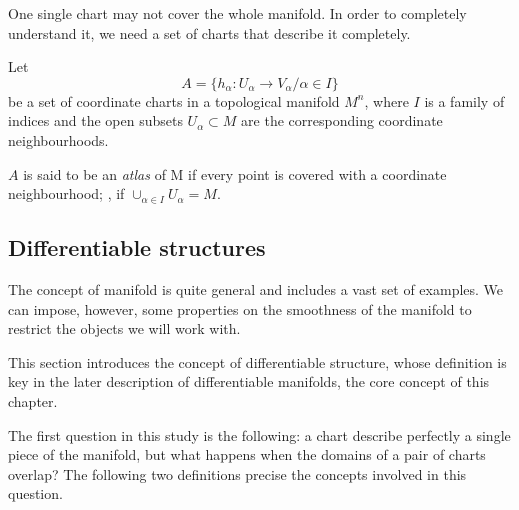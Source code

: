 One single chart may not cover the whole manifold. In order to completely understand it, we need a set of charts that describe it completely.

\begin{definition}
    Let
    \[
    A = \{h_\alpha \colon U_\alpha \to V_\alpha / \alpha \in I\}
    \]
    be a set of coordinate charts in a topological manifold $M^n$, where $I$ is a family of indices and the open subsets $U_\alpha \subset M$ are the corresponding coordinate neighbourhoods.

    $A$ is said to be an \emph{atlas} of M if every point is covered with a coordinate neighbourhood; \ie, if $\cup_{\alpha \in I} U_\alpha = M$.
\end{definition}


\subsection{Differentiable structures}

The concept of manifold is quite general and includes a vast set of examples. We can impose, however, some properties on the smoothness of the manifold to restrict the objects we will work with.

This section introduces the concept of differentiable structure, whose definition is key in the later description of differentiable manifolds, the core concept of this chapter.

The first question in this study is the following: a chart describe perfectly a single piece of the manifold, but what happens when the domains of a pair of charts overlap? The following two definitions precise the concepts involved in this question.



